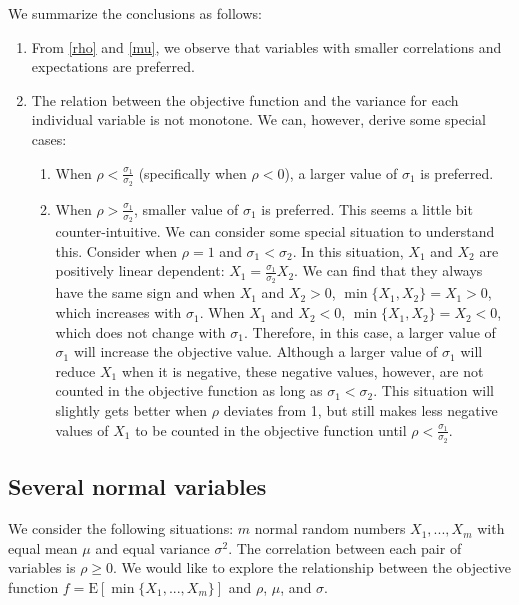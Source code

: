 \documentclass[opre,sglanonrev]{informs4}
\begin{document}
We summarize the conclusions as follows:
\begin{enumerate}
	\item From \eqref{rho} and \eqref{mu}, we observe that variables with smaller correlations and expectations are preferred.
	\item The relation between the objective function and the variance for each individual variable is not monotone. We can, however, derive some special cases:
	\begin{enumerate}
		\item When $\rho<\frac{\sigma_1}{\sigma_2}$ (specifically when $\rho<0$), a larger value of $\sigma_1$ is preferred.
		\item When $\rho>\frac{\sigma_1}{\sigma_2}$, smaller value of $\sigma_1$ is preferred. This seems a little bit counter-intuitive. We can consider some special situation to understand this. Consider when $\rho = 1$ and $\sigma_1<\sigma_2$. In this situation, $X_1$ and $X_2$ are positively linear dependent: $ X_1 = \frac{\sigma_1}{\sigma_2} X_2$. We can find that they always have the same sign and when $X_1$ and $X_2>0$, $\min\{X_1,X_2\}=X_1>0$, which increases with $\sigma_1$. When $X_1$ and $X_2<0$,  $\min\{X_1,X_2\}=X_2<0$, which does not change with $\sigma_1$. Therefore, in this case, a larger value of $\sigma_1$ will increase the objective value. Although a larger value of $\sigma_1$ will reduce $X_1$ when it is negative, these negative values, however, are not counted in the objective function as long as $\sigma_1<\sigma_2$. This situation will slightly gets better when $\rho$ deviates from 1, but still makes less negative values of $X_1$ to be counted in the objective function until $\rho<\frac{\sigma_1}{\sigma_2}$.
	\end{enumerate}
\end{enumerate}

\subsection{Several normal variables}

We consider the following situations: $m$ normal random numbers $X_1,...,X_m$ with equal mean $\mu$ and equal variance $\sigma^2$. The correlation between each pair of variables is $\rho\geq 0$. We would like to explore the relationship between the objective function  $f = \text{E}[\min\{X_1,...,X_m\}]$ and $\rho$, $\mu$, and $\sigma$.
\end{document}
